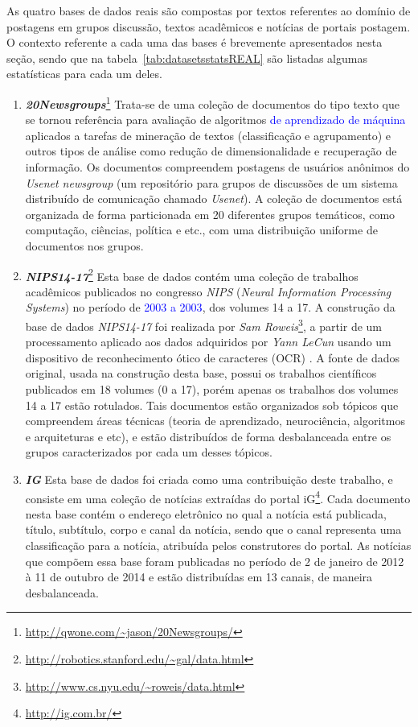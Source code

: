 \documentclass[
    12pt,                %
    oneside,            %
    a4paper,            %
    english,            %
    brazil                %
    ]{abntex2ppgsi}
\begin{document}
As quatro bases de dados reais são compostas por textos referentes ao domínio de postagens em grupos discussão, textos acadêmicos e notícias de portais postagem. O contexto referente a cada uma das bases é brevemente apresentados nesta seção, sendo que na tabela~\ref{tab:datasetsstatsREAL} são listadas algumas estatísticas para cada um deles.

\begin{enumerate}
    \item \textbf{\textit{20Newsgroups}}\footnote{\url{http://qwone.com/~jason/20Newsgroups/}} Trata-se de uma coleção de documentos do tipo texto que se tornou referência para avaliação de algoritmos \textcolor{blue}{de aprendizado de máquina} aplicados a tarefas de mineração de textos (classificação e agrupamento) e outros tipos de análise como redução de dimensionalidade e recuperação de informação. Os documentos compreendem postagens de usuários anônimos do \textit{Usenet newsgroup} (um repositório para grupos de discussões de um sistema distribuído de comunicação chamado \textit{Usenet}). A coleção de documentos está organizada de forma particionada em 20 diferentes grupos temáticos, como computação, ciências, política e etc., com uma distribuição uniforme de documentos nos grupos.

    \item \textbf{\textit{NIPS14-17}}\footnote{\url{http://robotics.stanford.edu/~gal/data.html}} Esta base de dados contém uma coleção de trabalhos acadêmicos publicados no congresso \textit{NIPS} (\textit{Neural Information Processing Systems}) no período de \textcolor{blue}{2003 a 2003}, dos volumes 14 a 17.
    A construção da base de dados \textit{NIPS14-17} foi realizada por \textit{Sam Roweis}\footnote{\url{http://www.cs.nyu.edu/~roweis/data.html}}, a partir de um processamento aplicado aos dados adquiridos por \textit{Yann LeCun} usando um dispositivo de reconhecimento ótico de caracteres (OCR) \cite{Chechik2007}. A fonte de dados original, usada na construção desta base, possui os trabalhos científicos publicados em 18 volumes (0 a 17), porém apenas os trabalhos dos volumes 14 a 17 estão rotulados. Tais documentos estão organizados sob tópicos que compreendem  áreas técnicas (teoria de aprendizado, neurociência, algoritmos e arquiteturas e etc), e estão distribuídos de forma desbalanceada entre os grupos caracterizados por cada um desses tópicos.

    \item \textbf{\textit{IG}} Esta base de dados foi criada como uma contribuição deste trabalho, e consiste em uma coleção de notícias extraídas do portal iG\footnote{\url{http://ig.com.br/}}.
    Cada documento nesta base contém o endereço eletrônico no qual a notícia está publicada, título, subtítulo, corpo e canal da notícia, sendo que o canal representa uma classificação para a notícia, atribuída pelos construtores do portal. As notícias que compõem essa base foram publicadas no período de 2 de janeiro de 2012 à 11 de outubro de 2014 e estão distribuídas em 13 canais, de maneira desbalanceada.
    

\end{enumerate}
\end{document}
